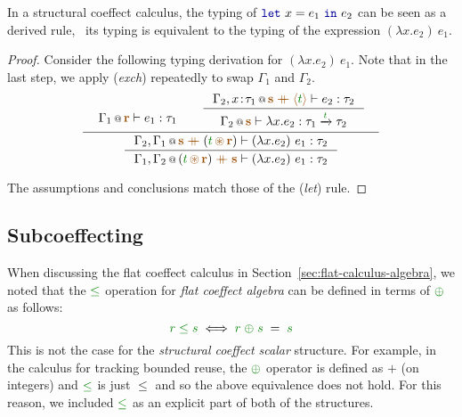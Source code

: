 \begin{proposition}
\label{thm:structural-letbinding}
In a structural coeffect calculus, the typing of $\kvd{let}~x=e_1~\kvd{in}~e_2$ can be
seen as a derived rule, \ie~its typing is equivalent to the typing of the expression
$(\lambda x.e_2)~e_1$.
\end{proposition}
\begin{proof}
Consider the following typing derivation for $(\lambda x.e_2)~e_1$. Note that
in the last step, we apply (\emph{exch}) repeatedly to swap $\Gamma_1$ and $\Gamma_2$.
%
\begin{equation*}
\inference
  { \begin{array}{l}\coctx{\Gamma_1}{\aclrd{\textbf{r}}} \vdash e_1 : \tau_1\vspace{-1.6em}\end{array} &
    \inference
      { \coctx{\Gamma_2, x\!:\!\tau_1}{\aclrd{\textbf{s}}\;\atimes\;\alift{\cclrd{t}}} \vdash e_2 : \tau_2 }
      { \coctx{\Gamma_2}{\aclrd{\textbf{s}}} \vdash \lambda x.e_2 : \tau_1 \xrightarrow{\cclrd{t}} \tau_2} \vspace{0.2em} }
  { \inference
      { \coctx{\Gamma_2, \Gamma_1}{\aclrd{\textbf{s}} \;\atimes\; (\cclrd{t} \,\aseq\, \aclrd{\textbf{r}})} \vdash (\lambda x.e_2)~e_1 : \tau_2 }
      { \coctx{\Gamma_1, \Gamma_2}{(\cclrd{t} \,\aseq\, \aclrd{\textbf{r}}) \;\atimes\;  \aclrd{\textbf{s}} } \vdash (\lambda x.e_2)~e_1 : \tau_2 } }
\end{equation*}

\noindent
The assumptions and conclusions match those of the (\emph{let}) rule.
\end{proof}


\subsection{Subcoeffecting}
\label{sec:structural-exts-sub}

When discussing the flat coeffect calculus in Section~\ref{sec:flat-calculus-algebra}, we noted
that the $\cleq$ operation for \emph{flat coeffect algebra} can be defined in terms of $\cpar$
as follows:
%
\begin{equation*}
\cclrd{r} \;\cleq\; \cclrd{s} \;\Longleftrightarrow\; \cclrd{r} \;\cpar\; \cclrd{s} \;=\; \cclrd{s}
\end{equation*}
%
This is not the case for the \emph{structural coeffect scalar} structure. For example, in the
calculus for tracking bounded reuse, the $\cpar$ operator is defined as $+$ (on integers) and
$\cleq$ is just $\leq$ and so the above equivalence does not hold. For this reason, we included
$\cleq$ as an explicit part of both of the structures.

